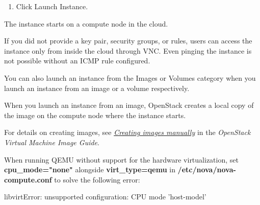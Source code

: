 \begin{enumerate}

\def\labelenumi{\arabic{enumi}.}
\item Click Launch Instance.
\end{enumerate}

The instance starts on a compute node in the cloud.

 If you did not provide a key pair, security groups, or
rules, users can access the instance only from inside the cloud
through VNC. Even pinging the instance is not possible without an ICMP
rule configured.

You can also launch an instance from the Images or Volumes category when
you launch an instance from an image or a volume respectively.

When you launch an instance from an image, OpenStack creates a local
copy of the image on the compute node where the instance starts.

For details on creating images, see
\href{https://docs.openstack.org/image-guide/create-images-manually.html}{\emph{Creating
images manually}} in the \emph{OpenStack Virtual Machine Image Guide}.

 When running QEMU without support for the hardware
virtualization, set \textbf{cpu\_mode="none"} alongside
\textbf{virt\_type=qemu} in \textbf{/etc/nova/nova-compute.conf} to
solve the following error:

libvirtError: unsupported configuration: CPU mode 'host-model'

